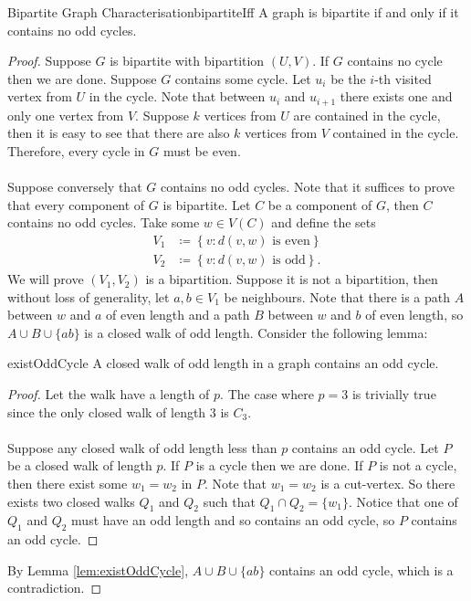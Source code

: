 \documentclass[math]{amznotes}
\theoremstyle{remark}
\begin{document}
\begin{thmbox}{Bipartite Graph Characterisation}{bipartiteIff}
    A graph is bipartite if and only if it contains no odd cycles.
    \tcblower
    \begin{proof}
        Suppose $G$ is bipartite with bipartition $(U, V)$. If $G$ contains no cycle then we are done. Suppose $G$ contains some cycle. Let $u_i$ be the $i$-th visited vertex from $U$ in the cycle. Note that between $u_i$ and $u_{i + 1}$ there exists one and only one vertex from $V$. Suppose $k$ vertices from $U$ are contained in the cycle, then it is easy to see that there are also $k$ vertices from $V$ contained in the cycle. Therefore, every cycle in $G$ must be even.
        \\\\
        Suppose conversely that $G$ contains no odd cycles. Note that it suffices to prove that every component of $G$ is bipartite. Let $C$ be a component of $G$, then $C$ contains no odd cycles. Take some $w \in V(C)$ and define the sets
        \begin{align*}
            V_1 & \coloneqq \left\{v \colon d(v, w) \textrm{ is even}\right\} \\
            V_2 & \coloneqq \left\{v \colon d(v, w) \textrm{ is odd}\right\}.
        \end{align*}
        We will prove $(V_1, V_2)$ is a bipartition. Suppose it is not a bipartition, then without loss of generality, let $a, b \in V_1$ be neighbours. Note that there is a path $A$ between $w$ and $a$ of even length and a path $B$ between $w$ and $b$ of even length, so $A \cup B \cup \{ab\}$ is a closed walk of odd length. Consider the following lemma:
        \begin{lembox}{}{existOddCycle}
            A closed walk of odd length in a graph contains an odd cycle.
            \tcblower
            \begin{proof}
                Let the walk have a length of $p$. The case where $p = 3$ is trivially true since the only closed walk of length $3$ is $C_3$. 
                \\\\
                Suppose any closed walk of odd length less than $p$ contains an odd cycle. Let $P$ be a closed walk of length $p$. If $P$ is a cycle then we are done. If $P$ is not a cycle, then there exist some $w_1 = w_2$ in $P$. Note that $w_1 = w_2$ is a cut-vertex. So there exists two closed walks $Q_1$ and $Q_2$ such that $Q_1 \cap Q_2 = \{w_1\}$. Notice that one of $Q_1$ and $Q_2$ must have an odd length and so contains an odd cycle, so $P$ contains an odd cycle.
            \end{proof}
        \end{lembox}
        By Lemma \ref{lem:existOddCycle}, $A \cup B \cup \{ab\}$ contains an odd cycle, which is a contradiction. 
    \end{proof}
\end{thmbox}
\end{document}
